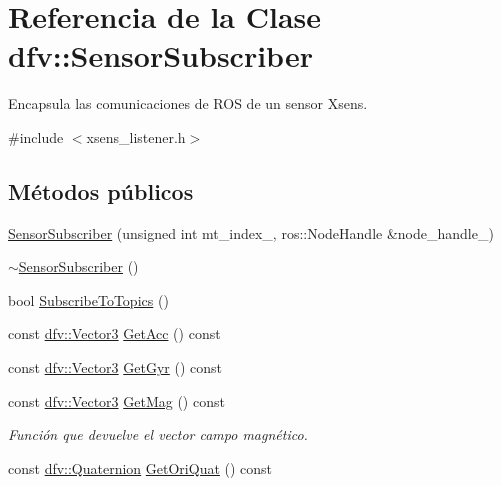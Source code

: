 \hypertarget{classdfv_1_1SensorSubscriber}{\section{\-Referencia de la \-Clase dfv\-:\-:\-Sensor\-Subscriber}
\label{classdfv_1_1SensorSubscriber}
}


\-Encapsula las comunicaciones de \-R\-O\-S de un sensor \-Xsens.  




{\ttfamily \#include $<$xsens\-\_\-listener.\-h$>$}

\subsection*{\-Métodos públicos}
\begin{DoxyCompactItemize}
\item 
\hyperlink{classdfv_1_1SensorSubscriber_a7596701a0faf0144e9c52cb09a92de86}{\-Sensor\-Subscriber} (unsigned int mt\-\_\-index\-\_\-, ros\-::\-Node\-Handle \&node\-\_\-handle\-\_\-)
\item 
\hyperlink{classdfv_1_1SensorSubscriber_aad63894472798f2e15e3f54bb8c7c78c}{$\sim$\-Sensor\-Subscriber} ()
\item 
bool \hyperlink{classdfv_1_1SensorSubscriber_ab33fdef7d3fff1bf80550a7c2f3b6889}{\-Subscribe\-To\-Topics} ()
\item 
const \hyperlink{classdfv_1_1Vector3}{dfv\-::\-Vector3} \hyperlink{classdfv_1_1SensorSubscriber_a8d90eadc91d8c97154b3d89341d5db40}{\-Get\-Acc} () const 
\item 
const \hyperlink{classdfv_1_1Vector3}{dfv\-::\-Vector3} \hyperlink{classdfv_1_1SensorSubscriber_a11fe5e8b67856541ec6a24291923dc62}{\-Get\-Gyr} () const 
\item 
\hypertarget{classdfv_1_1SensorSubscriber_af6eb616df620fb7d3b9036166bb2fdf6}{const \hyperlink{classdfv_1_1Vector3}{dfv\-::\-Vector3} \hyperlink{classdfv_1_1SensorSubscriber_af6eb616df620fb7d3b9036166bb2fdf6}{\-Get\-Mag} () const }\label{classdfv_1_1SensorSubscriber_af6eb616df620fb7d3b9036166bb2fdf6}

\begin{DoxyCompactList}\small\item\em \-Función que devuelve el vector campo magnético. \end{DoxyCompactList}\item 
\hypertarget{classdfv_1_1SensorSubscriber_a0e1dad84a58e4ae8708f288c8ae0082d}{const \hyperlink{classdfv_1_1Quaternion}{dfv\-::\-Quaternion} \hyperlink{classdfv_1_1SensorSubscriber_a0e1dad84a58e4ae8708f288c8ae0082d}{\-Get\-Ori\-Quat} () const }\label{classdfv_1_1SensorSubscriber_a0e1dad84a58e4ae8708f288c8ae0082d}


\end{DoxyCompactItemize}
